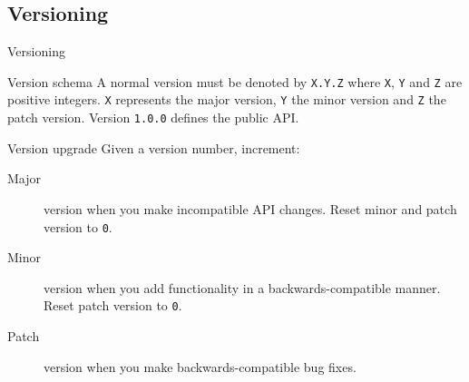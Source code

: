 \subsection{Versioning}
\begin{frame}{Versioning}
    \begin{block}{Version schema}
        A normal version must be denoted by \texttt{X.Y.Z} where \texttt{X}, \texttt{Y} and \texttt{Z} are positive integers. \texttt{X} represents the major version, \texttt{Y} the minor version and \texttt{Z} the patch version. Version \texttt{1.0.0} defines the public API.
    \end{block}

    \begin{block}{Version upgrade}
        Given a version number, increment:
        \begin{description}
            \item[Major] version when you make incompatible API changes. Reset minor and patch version to \texttt{0}.
            \item[Minor] version when you add functionality in a backwards-compatible manner. Reset patch version to \texttt{0}.
            \item[Patch] version when you make backwards-compatible bug fixes.
        \end{description}
    \end{block}
\end{frame}

